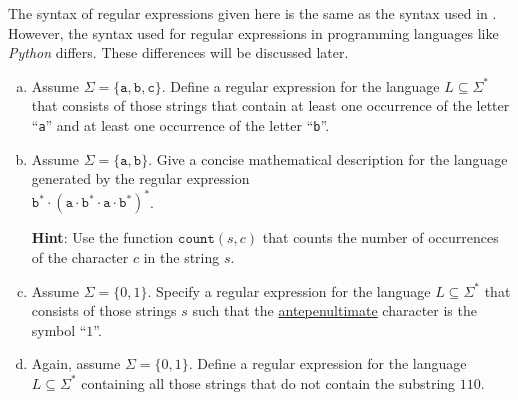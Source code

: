 \remarkEng
The syntax of regular expressions given here is the same as the syntax used in \cite{hopcroft:06}. However, the
syntax used for regular expressions in programming languages like \textsl{Python} differs. These differences
will be discussed later. 
\eox


\exerciseEng
\begin{enumerate}[(a)]
\item Assume $ \Sigma = \{ \mathtt{a}, \mathtt{b}, \mathtt{c} \} $. Define a regular expression for the
  language $ L \subseteq \Sigma^* $ that consists of those strings that contain at least one occurrence of the
  letter ``\texttt{a}'' and at least one occurrence of the letter ``\texttt{b}''. 
\item Assume $ \Sigma = \{ \mathtt{a}, \mathtt{b} \} $.  Give a concise mathematical description for the
  language generated  by the regular expression
  \\[0.2cm]
  \hspace*{1.3cm}
  $\texttt{b}^*\cdot(\texttt{a}\cdot\texttt{b}^*\cdot\texttt{a}\cdot\texttt{b}^*)^*$.

  \textbf{Hint}: Use the function $\texttt{count}(s, c)$ that counts the number of occurrences of the character
  $c$ in the string $s$. 

\item Assume $ \Sigma = \{ 0, 1 \} $. Specify a regular expression for the language $ L \subseteq \Sigma^* $ that consists of those strings $ s $ such that the \href{https://dictionary.cambridge.org/dictionary/english/antepenultimate}{antepenultimate} character is the symbol ``$ 1 $''.

\item Again, assume $\Sigma = \{ 0, 1 \}$. Define a regular expression for the language $L \subseteq \Sigma^*$
      containing all those strings that do not contain the substring $ 110 $.  



\end{enumerate}
